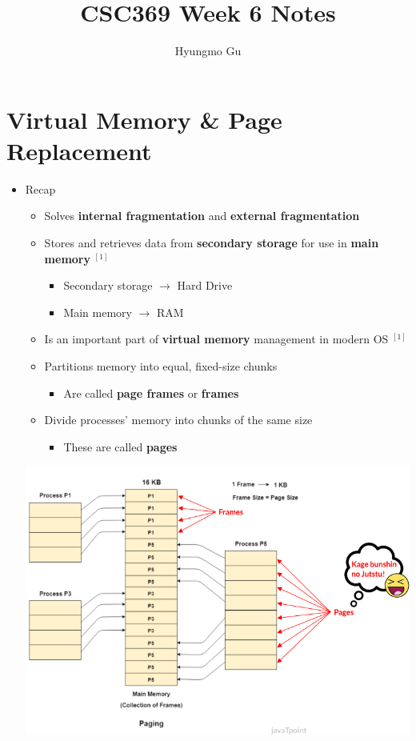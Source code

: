 \documentclass[12pt]{article}
\begin{document}
\title{CSC369 Week 6 Notes}
\author{Hyungmo Gu}
\maketitle

\bigskip

\section{Virtual Memory \& Page Replacement}

\bigskip

\begin{itemize}
    \item Recap
    \begin{itemize}
        \item Solves \textbf{internal fragmentation} and \textbf{external fragmentation}
        \item Stores and retrieves data from \textbf{secondary storage} for use
        in \textbf{main memory} $^{[1]}$
        \begin{itemize}
            \item Secondary storage $\to$ Hard Drive
            \item Main memory $\to$ RAM
        \end{itemize}
        \item Is an important part of \textbf{virtual memory} management in modern
        OS $^{[1]}$
        \item Partitions memory into equal, fixed-size chunks
        \begin{itemize}
            \item Are called \textbf{page frames} or \textbf{frames}
        \end{itemize}
        \item Divide processes' memory into chunks of the same size
        \begin{itemize}
            \item These are called \textbf{pages}
        \end{itemize}
    \end{itemize}

    \begin{center}
    \includegraphics[width=0.8\linewidth]{images/week_6_notes_1_1.png}
    \end{center}


\end{itemize}
\end{document}
